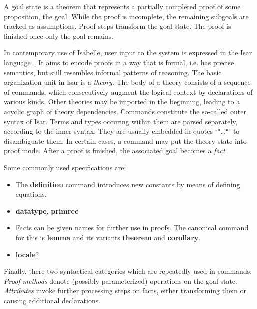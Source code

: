 A goal state is a theorem that represents a partially completed proof of some
proposition, the goal.
While the proof is incomplete, the remaining subgoals are tracked as
assumptions.
Proof steps transform the goal state.
The proof is finished once only the goal remains.


In contemporary use of Isabelle, user input to the system is expressed in
the Isar language~\cite{wenzel99,wenzel02,isar-ref}.
It aims to encode proofs in a way that is formal, i.e. has precise semantics,
but still resembles informal patterns of reasoning.
The basic organization unit in Isar is a \emph{theory}.
The body of a theory consists of a sequence of commands, which consecutively
augment the logical context by declarations of various kinds.
Other theories may be imported in the beginning, leading to a acyclic graph
of theory dependencies.
Commands constitute the so-called outer syntax of Isar.
Terms and types occuring within them are parsed separately, according to the
inner syntax.
They are usually embedded in quotes `\texttt{"}\dots\texttt{"}' to disambiguate
them.
In certain cases, a command may put the theory state into proof mode.
After a proof is finished, the associated goal becomes a \emph{fact}.

Some commonly used specifications are:
\begin{itemize}
\item The \textbf{definition} command introduces new constants by means of
	defining equations.
\item \todo{} \textbf{datatype}, \textbf{primrec}
\item Facts can be given names for further use in proofs.
	The canonical command for this is \textbf{lemma} and its variants
	\textbf{theorem} and \textbf{corollary}.
\item \todo{} \textbf{locale}?
\end{itemize}

Finally, there two syntactical categories which are repeatedly used in commands:
\emph{Proof methods} denote (possibly parameterized) operations on the goal state.
\emph{Attributes} invoke further processing steps on facts, either transforming
them or causing additional declarations.

